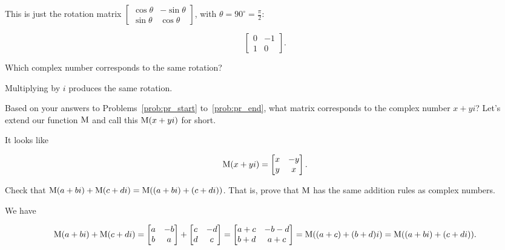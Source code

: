 \documentclass[../key.tex]{subfiles}
\begin{document}
This is just the rotation matrix $\left[\begin{smallmatrix} \cos \theta & -\sin\theta \\ \sin\theta & \cos\theta \end{smallmatrix}\right]$, with $\theta = 90^\circ = \frac{\pi}{2}$:

$$\begin{bmatrix} 0 & -1 \\ 1 & 0 \end{bmatrix}.$$

\begin{inner_problem}
\item Which complex number corresponds to the same rotation?
\end{inner_problem}

Multiplying by $i$ produces the same rotation.

\begin{outer_problem}
\item Based on your answers to Problems~\ref{prob:pr_start} to~\ref{prob:pr_end}, what matrix corresponds to the complex number $x+yi$? Let's extend our function $\operatorname{M}$ and call this $\operatorname{M} (x+yi)$ for short.
\end{outer_problem}

It looks like

$$\operatorname{M}(x+yi) = \begin{bmatrix} x & -y \\ y & x \end{bmatrix}.$$

\begin{outer_problem}
\item Check that $\operatorname{M} (a+bi)+\operatorname{M} (c+di)=\operatorname{M}((a+bi)+(c+di))$. That is, prove that $\operatorname{M}$ has the same addition rules as complex numbers.
\end{outer_problem}

We have

$$\operatorname{M} (a+bi)+\operatorname{M} (c+di) = \begin{bmatrix} a & -b \\ b & a \end{bmatrix} + \begin{bmatrix} c & -d \\ d & c \end{bmatrix} = \begin{bmatrix} a + c & -b-d \\ b+d & a+c\end{bmatrix} = \operatorname{M}((a+c) + (b+d)i) = \operatorname{M}((a+bi)+(c+di)).$$
\end{document}
